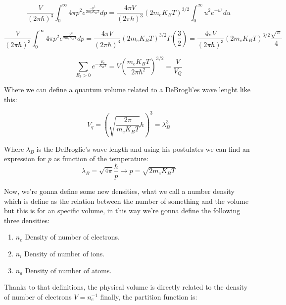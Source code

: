 \documentclass[spanish,notitlepage,letterpaper,11pt]{article} %
\numberwithin{equation}{subsection}
\begin{document}
    \begin{equation*}
        \frac{V}{(2\pi\hbar)^3}\int_{0}^{\infty}4\pi p^2e^{\frac{-p^2}{2m_eK_BT}}dp = \frac{4\pi V}{(2\pi\hbar)^3}(2m_eK_BT)^{3/2}\int_0^{\infty}u^2e^{-u^2}du 
    \end{equation*}

    \begin{equation*}
        \frac{V}{(2\pi\hbar)^3}\int_{0}^{\infty}4\pi p^2e^{\frac{-p^2}{2m_eK_BT}}dp = \frac{4\pi V}{(2\pi\hbar)^3}(2m_eK_BT)^{3/2}\Gamma(\frac{3}{2}) = \frac{4\pi V}{(2\pi\hbar)^3}(2m_eK_BT)^{3/2}\frac{\sqrt{\pi}}{4}
    \end{equation*}

    \begin{equation*}
        \sum_{E_k > 0}e^{-\frac{E_k}{K_BT}} = V\left(\frac{m_eK_BT}{2\pi\hbar^2}\right)^{3/2} = \frac{V}{V_Q}
    \end{equation*}

    Where we can define a quantum volume related to a DeBrogli'es wave lenght like this:

    \begin{equation*}
        V_q = \left(\sqrt{\frac{2\pi}{m_eK_BT}}\hbar\right)^3 = \lambda_B^3
    \end{equation*}

    Where $\lambda_B$ is the DeBroglie's wave length and using his postulates we can find an expression for $p$ as function of the temperature:
    \begin{equation*}
        \lambda_B = \sqrt{4\pi}\frac{\hbar}{p} \rightarrow p = \sqrt{2m_eK_BT}
    \end{equation*}

    Now, we're gonna define some new densities, what we call a number density which is define as the relation between the number of something and the volume but this is for an specific volume, in this way we're gonna define the following three densities:

    \begin{enumerate}
        \item $n_e$ Density of number of electrons.
        \item $n_i$ Density of number of ions.
        \item $n_a$ Density of number of atoms.
    \end{enumerate}

    Thanks to that definitions, the physical volume is directly related to the density of number of electrons $V = n_e^{-1}$ finally, the partition function is:
\end{document}
